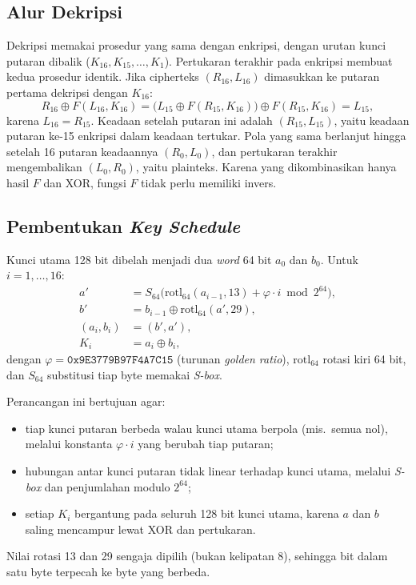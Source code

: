 \subsection{Alur Dekripsi}
Dekripsi memakai prosedur yang sama dengan enkripsi, dengan urutan kunci putaran dibalik
($K_{16}, K_{15}, \dots, K_1$). Pertukaran terakhir pada enkripsi membuat kedua prosedur
identik. Jika cipherteks $(R_{16}, L_{16})$ dimasukkan ke putaran pertama dekripsi dengan $K_{16}$:
\begin{equation}
  R_{16} \oplus F(L_{16}, K_{16}) = \bigl(L_{15} \oplus F(R_{15}, K_{16})\bigr) \oplus F(R_{15}, K_{16}) = L_{15},
\end{equation}
karena $L_{16} = R_{15}$. Keadaan setelah putaran ini adalah $(R_{15}, L_{15})$, yaitu keadaan
putaran ke-15 enkripsi dalam keadaan tertukar. Pola yang sama berlanjut hingga setelah 16 putaran
keadaannya $(R_0, L_0)$, dan pertukaran terakhir mengembalikan $(L_0, R_0)$, yaitu plainteks. Karena
yang dikombinasikan hanya hasil $F$ dan XOR, fungsi $F$ tidak perlu memiliki invers.

\subsection{Pembentukan \textit{Key Schedule}}
Kunci utama 128 bit dibelah menjadi dua \textit{word} 64 bit $a_0$ dan $b_0$. Untuk
$i = 1, \dots, 16$:
\begin{align*}
  a' &= S_{64}\bigl(\mathrm{rotl}_{64}(a_{i-1}, 13) + \varphi \cdot i \bmod 2^{64}\bigr), \\
  b' &= b_{i-1} \oplus \mathrm{rotl}_{64}(a', 29), \\
  (a_i, b_i) &= (b', a'), \\
  K_i &= a_i \oplus b_i,
\end{align*}
dengan $\varphi = \texttt{0x9E3779B97F4A7C15}$ (turunan \textit{golden ratio}), $\mathrm{rotl}_{64}$ rotasi
kiri 64 bit, dan $S_{64}$ substitusi tiap byte memakai \textit{S-box}.

Perancangan ini bertujuan agar:
\begin{itemize}
  \item tiap kunci putaran berbeda walau kunci utama berpola (mis.\ semua nol), melalui konstanta
    $\varphi \cdot i$ yang berubah tiap putaran;
  \item hubungan antar kunci putaran tidak linear terhadap kunci utama, melalui \textit{S-box} dan
    penjumlahan modulo $2^{64}$;
  \item setiap $K_i$ bergantung pada seluruh 128 bit kunci utama, karena $a$ dan $b$ saling
    mencampur lewat XOR dan pertukaran.
\end{itemize}
Nilai rotasi 13 dan 29 sengaja dipilih (bukan kelipatan 8), sehingga bit dalam satu byte terpecah ke
byte yang berbeda.

